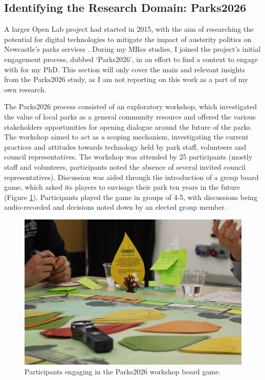 \subsection{Identifying the Research Domain: Parks2026}
\label{sec:Parks2026}

A larger Open Lab project had started in 2015, with the aim of researching the potential for digital technologies to mitigate the impact of austerity politics on Newcastle's parks services \citep{Crivellaro2019}. During my MRes studies, I joined the project's initial engagement process, dubbed `Parks2026', in an effort to find a context to engage with for my PhD. This section will only cover the main and relevant insights from the Parks2026 study, as I am not reporting on this work as a part of my own research.

The Parks2026 process consisted of an exploratory workshop, which investigated the value of local parks as a general community resource and offered the various stakeholders opportunities for opening dialogue around the future of the parks. The workshop aimed to act as a scoping mechanism, investigating the current practices and attitudes towards technology held by park staff, volunteers and council representatives. The workshop was attended by 25 participants (mostly staff and volunteers, participants noted the absence of several invited council representatives). Discussion was aided through the introduction of a group board game, which asked its players to envisage their park ten years in the future (Figure \ref{fig:parks2026}). Participants played the game in groups of 4-5, with discussions being audio-recorded and decisions noted down by an elected group member.

\begin{figure}
  \centering
  \includegraphics[width=0.8\columnwidth]{images/chapter04/parks2026.jpg}
  \caption{Participants engaging in the Parks2026 workshop board game.}
  \label{fig:parks2026}
\end{figure}

